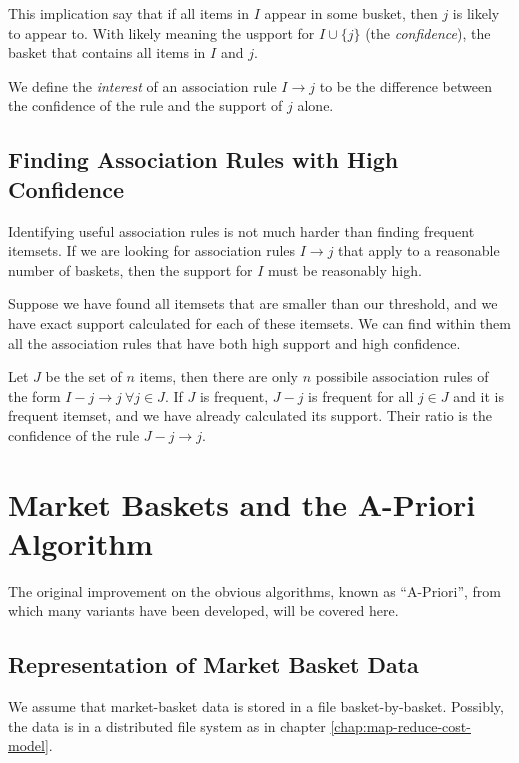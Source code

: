 This implication say that if all items in $I$ appear in some busket, then $j$ is likely to appear to. With likely meaning the uspport for $I \cup \{j\}$ (the \textit{confidence}), the basket that contains all items in $I$ and $j$.

We define the \textit{interest} of an association rule $I \rightarrow j$ to be the difference between the confidence of the rule and the support of $j$ alone.

\subsection{Finding Association Rules with High Confidence}\label{subsec:finding-association-rules-with-high-confidence}

Identifying useful association rules is not much harder than finding frequent itemsets. If we are looking for association rules $I \rightarrow j$ that apply to a reasonable number of baskets, then the support for $I$ must be reasonably high.

Suppose we have found all itemsets that are smaller than our threshold, and we have exact support calculated for each of these itemsets. We can find within them all the association rules that have both high support and high confidence. 

Let $J$ be the set of $n$ items, then there are only $n$ possibile association rules of the form $I - {j}\rightarrow j \  \forall j\in J$. If $J$ is frequent, $J - {j}$ is frequent for all $j \in J$ and it is frequent itemset, and we have already calculated its support. Their ratio is the confidence of the rule $J - {j}\rightarrow j$.

\section{Market Baskets and the A-Priori Algorithm}\label{sec:market-baskets-and-the-a-priori-algorithm}

The original improvement on the obvious algorithms, known as ``A-Priori'', from which many variants have been developed, will be covered here.

\subsection{Representation of Market Basket Data}\label{subsec:representation-of-market-basket-data}

We assume that market-basket data is stored in a file basket-by-basket. Possibly, the data is in a distributed file system as in chapter \ref{chap:map-reduce-cost-model}.

